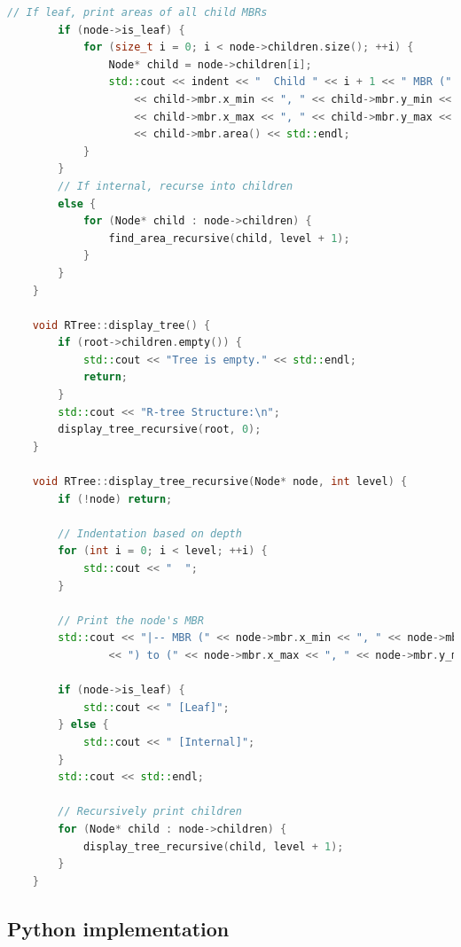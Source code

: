 \documentclass{article}
\begin{document}
\begin{lstlisting}[language=c++]
		// If leaf, print areas of all child MBRs
		if (node->is_leaf) {
			for (size_t i = 0; i < node->children.size(); ++i) {
				Node* child = node->children[i];
				std::cout << indent << "  Child " << i + 1 << " MBR ("
					<< child->mbr.x_min << ", " << child->mbr.y_min << ", "
					<< child->mbr.x_max << ", " << child->mbr.y_max << "): "
					<< child->mbr.area() << std::endl;
			}
		}
		// If internal, recurse into children
		else {
			for (Node* child : node->children) {
				find_area_recursive(child, level + 1);
			}
		}
	}

	void RTree::display_tree() {
		if (root->children.empty()) {
			std::cout << "Tree is empty." << std::endl;
			return;
		}
		std::cout << "R-tree Structure:\n";
		display_tree_recursive(root, 0);
	}

	void RTree::display_tree_recursive(Node* node, int level) {
		if (!node) return;

		// Indentation based on depth
		for (int i = 0; i < level; ++i) {
			std::cout << "  ";
		}

		// Print the node's MBR
		std::cout << "|-- MBR (" << node->mbr.x_min << ", " << node->mbr.y_min
				<< ") to (" << node->mbr.x_max << ", " << node->mbr.y_max << ")";

		if (node->is_leaf) {
			std::cout << " [Leaf]";
		} else {
			std::cout << " [Internal]";
		}
		std::cout << std::endl;

		// Recursively print children
		for (Node* child : node->children) {
			display_tree_recursive(child, level + 1);
		}
	}
\end{lstlisting}

\subsection{Python implementation}
\end{document}
